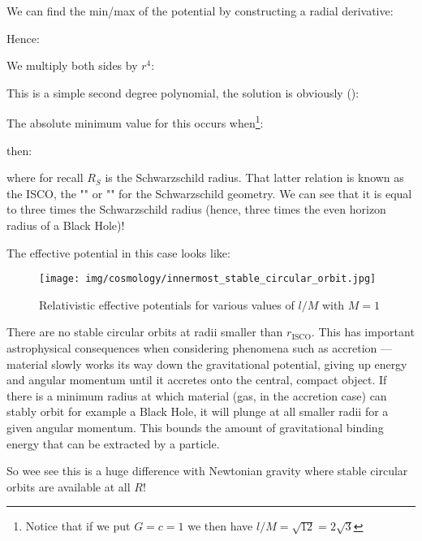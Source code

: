 	We can find the min/max of the potential by constructing a radial derivative:
	
	Hence:
	
	We multiply both sides by $r^4$:
	
	This is a simple second degree polynomial, the solution is obviously ():
	
	The absolute minimum value for this occurs when\footnote{Notice that if we put $G=c=1$ we then have $l/M=\sqrt{12}=2\sqrt{3}$}:
	
	then:
	
	where for recall $R_S$ is the Schwarzschild radius.	That latter relation is known as the ISCO, the "" or "" for the Schwarzschild geometry. We can see that it is equal to three times the Schwarzschild radius (hence, three times the even horizon radius of a Black Hole)!
	
	The effective potential in this case looks like:
	\begin{figure}[H]
		\centering
		\texttt{[image: img/cosmology/innermost\_stable\_circular\_orbit.jpg]}
		\caption{Relativistic effective potentials for various values of $l/M$ with $M=1$}
	\end{figure}
	There are no stable circular orbits at radii smaller than $r_\text{ISCO}$. This has important astrophysical consequences when considering phenomena such as accretion — material slowly works its way down the gravitational potential, giving up energy and angular momentum until it accretes onto the central, compact object. If there is a minimum radius at which material (gas, in the accretion case) can stably orbit for example a Black Hole, it will plunge at all smaller radii for a given angular momentum. This bounds the amount of gravitational binding energy that can be extracted by a particle.
	
	So wee see this is a huge difference with Newtonian gravity where stable circular orbits are available at all $R$!
	
